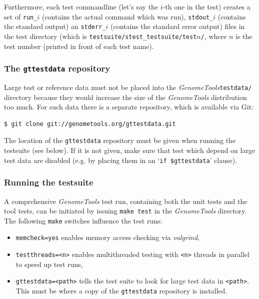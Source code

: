 \documentclass[11pt,final]{article}
\newcommand{\keyword}[1]{\lstinline{#1}}
\newcommand{\Gt}[0]{\emph{GenomeTools}\xspace}
\begin{document}
Furthermore, each test commandline (let's say the $i$-th one in the test)
creates a set of \keyword{run_}$i$ (contains the actual command which was run),
\keyword{stdout_}$i$ (contains the standard output) an \keyword{stderr_}$i$
(contains the standard error output) files in the test directory (which is
\keyword{testsuite/stest_testsuite/test}$n$\keyword{/}, where $n$ is the test
number (printed in front of each test name).

\subsubsection{The \keyword{gttestdata} repository}
\label{gttestdata}

Large test or reference data must not be placed into the \Gt \keyword{testdata/}
directory because they would increase the size of the \Gt distribution too much.
For such data there is a separate repository, which is available via Git:

\begin{lstlisting}[language=sh]
$ git clone git://genometools.org/gttestdata.git
\end{lstlisting}%

The location of the \keyword{gttestdata} repository must be given when running
the testsuite (see below). If it is not given, make sure that test which depend
on large test data are disabled (e.g. by placing them in an
`\keyword{if $gttestdata}' clause).%

\subsubsection{Running the testsuite}
A comprehensive \Gt test run, containing both the unit tests and the tool tests,
can be initiated by issuing \keyword{make test} in the \Gt directory.
The following \keyword{make} switches influence the test runs:
\begin{itemize}
\item
\keyword{memcheck=yes} enables memory access checking via \emph{valgrind},
\item
\keyword{testthreads=<n>} enables multithreaded testing with \keyword{<n>}
threads in parallel to speed up test runs,
\item
\keyword{gttestdata=<path>} tells the test suite to look for large test data in
\keyword{<path>}. This must be where a copy of the \keyword{gttestdata}
repository is installed.

\end{itemize}
\end{document}
